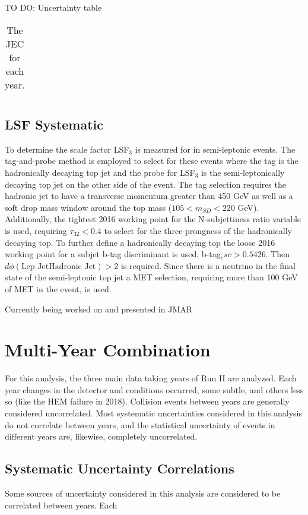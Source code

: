 {\color{red} TO DO: Uncertainty table}

\begin{table}[tp]
  \caption{
    The JEC for each year.
  }
  \centering
  \label{tab:systematics}
  \begin{tabular}{ c l l }
\hline
\hline
  \end{tabular}
\end{table}

\subsection{LSF Systematic}
\label{sec:lsf_sys}
To determine the scale factor LSF$_3$ is measured for in semi-leptonic \ttbar events.
The tag-and-probe method is employed to select for these events where the tag is
the hadronically decaying top jet and the probe for LSF$_3$ is the
semi-leptonically decaying top jet on the other side of the event. The tag
selection requires the hadronic jet to have a transverse momentum greater than
450 GeV as well as a soft drop
mass window around the top mass ($105 < m_{SD} < 220$ GeV). Additionally, the tightest 2016 working point for the N-subjettiness ratio variable is used, requiring
$\tau_{32} < 0.4$ to select for the three-prongness of the hadronically decaying
top. To further define a hadronically decaying top the
loose 2016 working point for a subjet b-tag discriminant is used, b-tag$_csv > 0.5426$. Then $d\phi(\text{Lep Jet} \text{Hadronic Jet}) > 2$ is required. Since there is a neutrino in
the final state of the semi-leptonic top jet a MET selection, requiring more
than 100 GeV of MET in the event, is used.

{\color{red} Currently being worked on and presented in JMAR} 

\section{Multi-Year Combination}
For this analysis, the three main data taking years of Run II are analyzed. Each year changes in the detector and \LHC conditions occurred, some subtle, and others less so (like the HEM failure in 2018). Collision events between years are generally considered uncorrelated. Most systematic uncertainties considered in this analysis do not correlate between years, and the statistical uncertainty of events in different years are, likewise, completely uncorrelated.

\subsection{Systematic Uncertainty Correlations}
\label{sec:multiyearsys}
Some sources of uncertainty considered in this analysis are considered to be correlated between years. Each 
